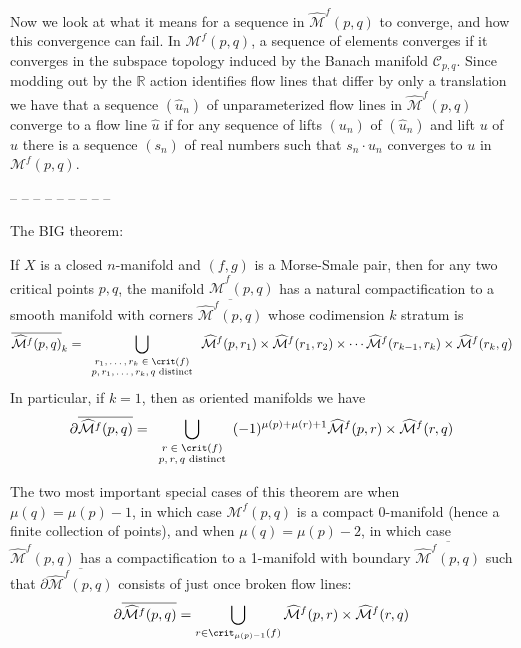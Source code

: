 Now we look at what it means for a sequence in $\widehat{\mathcal M}^f(p,q)$ to converge, and how this convergence can fail. In $\mathcal M^f(p,q)$, a sequence of elements converges if it converges in the subspace topology induced by the Banach manifold $\mathcal C_{p,q}$. Since modding out by the $\mathbb R$ action identifies flow lines that differ by only a translation we have that a sequence $(\widehat{u}_n)$ of unparameterized flow lines in $\widehat{\mathcal M}^f(p,q)$ converge to a flow line $\widehat{u}$ if for any sequence of lifts $(u_n)$ of $(\widehat{u}_n)$ and lift $u$ of $\widehat{u}$ there is a sequence $(s_n)$ of real numbers such that $s_n \cdot u_n$ converges to $u$ in $\mathcal M^f(p,q)$.






-- -- -- -- -- -- -- -- -- 

The BIG theorem:
\begin{thm}
\label{compactification of the moduli space of unparameterized flow lines}
If $X$ is a closed $n$-manifold and $(f,g)$ is a Morse-Smale pair, then for any two critical points $p,q$, the manifold $\widehat{\mathcal M}^f(p,q)$ has a natural compactification to a smooth manifold with corners $\overline{\widehat{\mathcal M}^f(p,q)}$ whose codimension $k$ stratum is
\[ \overline{\widehat{\mathcal M}^f(p,q)}_k = \bigcup_{\scriptsize\begin{array}{c} r_1,\ldots,r_k \in \crit(f) \\ p,r_1,\ldots,r_k,q \text{ distinct} \end{array}} \widehat{\mathcal M}^f(p,r_1) \times \widehat{\mathcal M}^f(r_1,r_2) \times \cdots \widehat{\mathcal M}^f(r_{k-1},r_k) \times \widehat{\mathcal M}^f(r_k,q) \]
In particular, if $k=1$, then as oriented manifolds we have
\[ \partial \overline{\widehat{\mathcal M}^f(p,q)} = \bigcup_{\scriptsize\begin{array}{c} r \in \crit(f) \\ p,r,q \text{ distinct} \end{array}} (-1)^{\mu(p)+\mu(r)+1} \widehat{\mathcal M}^f(p,r) \times \widehat{\mathcal M}^f(r,q) \]
\end{thm}

The two most important special cases of this theorem are when $\mu(q)=\mu(p)-1$, in which case $\mathcal M^f(p,q)$ is a compact 0-manifold (hence a finite collection of points), and when $\mu(q)=\mu(p)-2$, in which case $\widehat{\mathcal M}^f(p,q)$ has a compactification to a 1-manifold with boundary $\overline{\widehat{\mathcal M}^f(p,q)}$ such that $\partial\overline{\widehat{\mathcal M}^f(p,q)}$ consists of just once broken flow lines:
\[ \partial \overline{\widehat{\mathcal M}^f(p,q)} = \bigcup_{r \in \crit_{\mu(p)-1}(f)} \widehat{\mathcal M}^f(p,r) \times \widehat{\mathcal M}^f(r,q) \]








